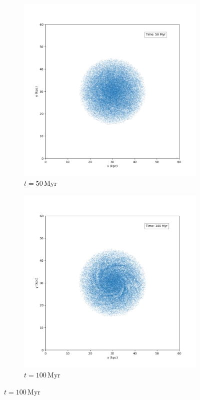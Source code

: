 \begin{figure}[htp]
    \centering
    \begin{subfigure}[b]{0.45\textwidth}
        \centering
        \includegraphics[width=\textwidth]{chapters/results/img/p3m-galaxy/50myr.png}
        \caption{$t=50\,\text{Myr}$}
        \label{fig:spiral-galaxy-evolution-p3m-sub1}
    \end{subfigure}
    \hfill
    \begin{subfigure}[b]{0.45\textwidth}
        \centering
        \includegraphics[width=\textwidth]{chapters/results/img/p3m-galaxy/100myr.png}
        \caption{$t=100\,\text{Myr}$}
        \label{fig:spiral-galaxy-evolution-p3m-sub2}
    \end{subfigure}


\end{figure}
